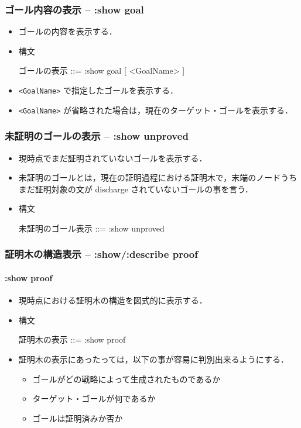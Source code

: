 \documentclass[a4paper,oneside,10pt,here]{memoir}
\newenvironment{vvtm}%
{\parskip=0pt\lineskip=0pt\begin{center}\begin{minipage}{0.8\textwidth}\begin{snugshade}}%
  {\end{snugshade}\end{minipage}\end{center}}
\begin{document}
\subsubsection{ゴール内容の表示 -- :show goal}
\begin{itemize}
\item ゴールの内容を表示する．
\item 構文
  \begin{vvtm}
    \begin{simplev}
    ゴールの表示 ::= :show goal [ <GoalName> ]
  \end{simplev}
\end{vvtm}
\item \verb|<GoalName>| で指定したゴールを表示する．
\item \verb|<GoalName>| が省略された場合は，現在のターゲット・ゴールを表示する．
\end{itemize}

\subsubsection{未証明のゴールの表示 -- :show unproved}
\begin{itemize}
\item 現時点でまだ証明されていないゴールを表示する．
\item 未証明のゴールとは，現在の証明過程における証明木で，末端のノードうち
  まだ証明対象の文が discharge されていないゴールの事を言う．
\item 構文
  \begin{vvtm}
    \begin{simplev}
      未証明のゴール表示 ::= :show unproved
    \end{simplev}
  \end{vvtm}
\end{itemize}

\subsubsection{証明木の構造表示 -- :show/:describe  proof}

\paragraph{:show proof}
\begin{itemize}
\item 現時点における証明木の構造を図式的に表示する．
\item 構文
  \begin{vvtm}
    \begin{simplev}
   証明木の表示 ::= :show proof
    \end{simplev}
  \end{vvtm}
\item 証明木の表示にあったっては，以下の事が容易に判別出来るようにする．
  \begin{itemize}
  \item ゴールがどの戦略によって生成されたものであるか
  \item ターゲット・ゴールが何であるか
  \item ゴールは証明済みか否か
  \end{itemize}
\end{itemize}
\end{document}

